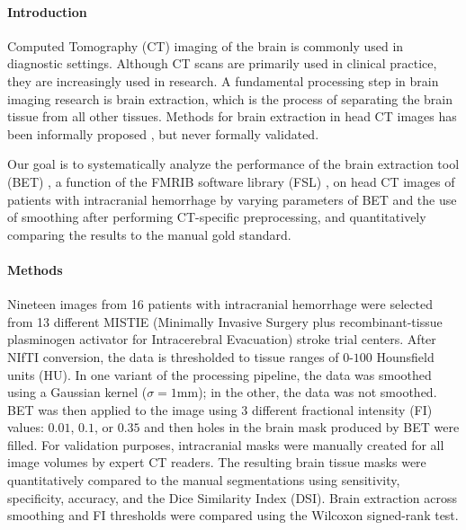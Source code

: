 \documentclass[10pt]{article}\usepackage[]{graphicx}\usepackage[]{color}
\begin{document}
\renewcommand{\thesubfigure}{\Alph{subfigure}}

\vspace{-1cm}
\paragraph*{Introduction}
Computed Tomography (CT) imaging of the brain is commonly used in diagnostic settings.  Although CT scans are primarily used in clinical practice, they are increasingly used in research.  A fundamental processing step in brain imaging research is brain extraction, which is the process of separating the brain tissue from all other tissues. Methods for brain extraction in head CT images has been informally proposed \citep{able, rorden_age-specific_2012}, but never formally validated.

Our goal is to systematically analyze the performance of the brain extraction tool (BET) \citep{smith_fast_2002}, a function of the FMRIB software library (FSL) \citep{jenkinson_fsl_2012}, on head CT images of patients with intracranial hemorrhage by varying parameters of BET and the use of smoothing after performing CT-specific preprocessing, and quantitatively comparing the results to the manual gold standard.

\vspace{-0.4cm}
\paragraph*{Methods}
Nineteen images from 16 patients with intracranial hemorrhage were selected from 13 different MISTIE (Minimally Invasive Surgery plus recombinant-tissue plasminogen activator for Intracerebral Evacuation) stroke trial centers. After NIfTI conversion, the data is thresholded to tissue ranges of $0$-$100$ Hounsfield units (HU).  In one variant of the processing pipeline, the data was smoothed using a Gaussian kernel ($\sigma=1$mm); in the other, the data was not smoothed.  BET was then applied to the image using 3 different fractional intensity (FI) values: $0.01$, $0.1$, or $0.35$ and then holes in the brain mask produced by BET were filled.
For validation purposes, intracranial masks were manually created for all image volumes by expert CT readers.  The resulting brain tissue masks were quantitatively compared to the manual segmentations using sensitivity, specificity, accuracy, and the Dice Similarity Index (DSI).  Brain extraction across smoothing and FI thresholds were compared using the Wilcoxon signed-rank test.
\end{document}
